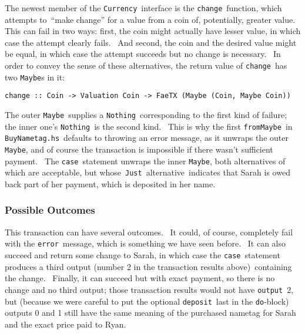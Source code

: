 \documentclass[11pt]{article}
\newcommand{\codeblock}[1]{\begin{mdframed}[
    backgroundcolor=header-color,
    linecolor=header-color,
    innertopmargin=10pt,
    ]{\texttt{#1}}\end{mdframed}}
\begin{document}
The newest member of the \texttt{Currency} interface is the \texttt{change} function, which attempts to “make change” for a value from a coin of, potentially, greater value.  This can fail in two ways: first, the coin might actually have lesser value, in which case the attempt clearly fails.  And second, the coin and the desired value might be equal, in which case the attempt succeeds but no change is necessary.  In order to convey the sense of these alternatives, the return value of \texttt{change} has two \texttt{Maybe}s in it:

\codeblock{change :: Coin -\textgreater{} Valuation Coin -\textgreater{} FaeTX (Maybe (Coin, Maybe Coin))}

The outer \texttt{Maybe} supplies a \texttt{Nothing} corresponding to the first kind of failure; the inner one's \texttt{Nothing} is the second kind.  This is why the first \texttt{fromMaybe} in \texttt{BuyNametag.hs} defaults to throwing an error message, as it unwraps the outer \texttt{Maybe}, and of course the transaction is impossible if there wasn't sufficient payment.  The \texttt{case} statement unwraps the inner \texttt{Maybe}, both alternatives of which are acceptable, but whose \texttt{Just} alternative indicates that Sarah is owed back part of her payment, which is deposited in her name.

\subsubsection{Possible Outcomes}
\vspace{5.5pt}

This transaction can have several outcomes.  It could, of course, completely fail with the \texttt{error} message, which is something we have seen before.  It can also succeed and return some change to Sarah, in which case the \texttt{case} statement produces a third output (number 2 in the transaction results above) containing the change.  Finally, it can succeed but with exact payment, so there is no change and no third output; those transaction results would not have \texttt{output} 2, but (because we were careful to put the optional \texttt{deposit} last in the \texttt{do}-block) outputs 0 and 1 still have the same meaning of the purchased nametag for Sarah and the exact price paid to Ryan.


\vspace{11pt}
\end{document}
